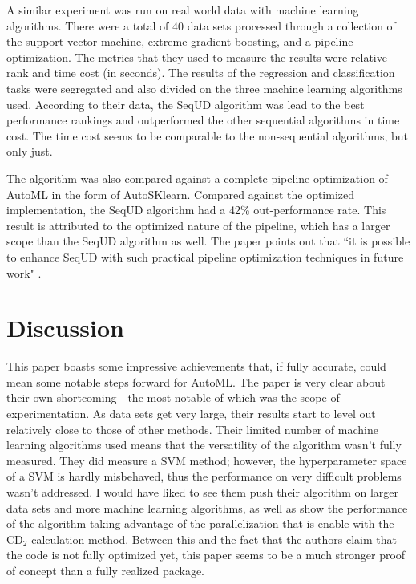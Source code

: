 \documentclass[twoside,11pt]{article}
\begin{document}
A similar experiment was run on real world data with machine learning algorithms. There were a total of 40 data sets processed through a collection of the support vector machine, extreme gradient boosting, and a pipeline optimization. The metrics that they used to measure the results were relative rank and time cost (in seconds). The results of the regression and classification tasks were segregated and also divided on the three machine learning algorithms used. According to their data, the SeqUD algorithm was lead to the best performance rankings and outperformed the other sequential algorithms in time cost. The time cost seems to be comparable to the non-sequential algorithms, but only just. 

The algorithm was also compared against a complete pipeline optimization of AutoML in the form of AutoSKlearn. Compared against the optimized implementation, the SeqUD algorithm had a 42\% out-performance rate. This result is attributed to the optimized nature of the pipeline, which has a larger scope than the SeqUD algorithm as well. The paper points out that ``it is possible to enhance SeqUD with such practical pipeline optimization techniques in future work" \citep{yang2021hyperparameter}.

\section{Discussion}
This paper boasts some impressive achievements that, if fully accurate, could mean some notable steps forward for AutoML. The paper is very clear about their own shortcoming - the most notable of which was the scope of experimentation. As data sets get very large, their results start to level out relatively close to those of other methods. Their limited number of machine learning algorithms used means that the versatility of the algorithm wasn't fully measured. They did measure a SVM method; however, the hyperparameter space of a SVM is hardly misbehaved, thus the performance on very difficult problems wasn't addressed. I would have liked to see them push their algorithm on larger data sets and more machine learning algorithms, as well as show the performance of the algorithm taking advantage of the parallelization that is enable with the CD$_2$ calculation method. Between this and the fact that the authors claim that the code is not fully optimized yet, this paper seems to be a much stronger proof of concept than a fully realized package. 
\end{document}
